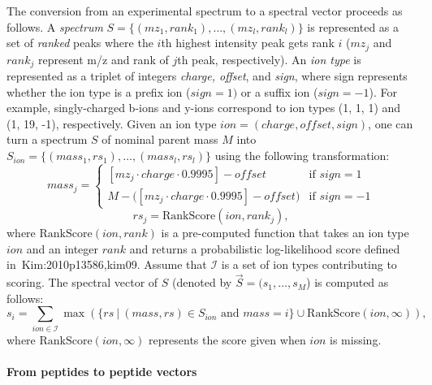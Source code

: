 The conversion from an experimental spectrum to a spectral vector proceeds as follows.
A \emph{spectrum} $S=\{(mz_1,rank_1),\ldots,(mz_l,rank_l)\}$ is represented as a set of {\em ranked} peaks where the $i$th highest intensity peak gets rank $i$
($mz_j$ and $rank_j$ represent m/z and rank of $j$th peak, respectively).
An \emph{ion type} is represented as a triplet of integers {\em charge, offset}, and {\em sign}, where sign represents whether the ion type is a prefix ion ($sign=1)$ or
a suffix ion ($sign=-1$). For example, singly-charged b-ions and y-ions correspond to ion types (1, 1, 1) and (1, 19, -1), respectively.
Given an ion type $ion=(charge,offset,sign)$, one can turn a spectrum $S$ of nominal parent mass $M$ into $S_{ion}=\{(mass_1,rs_1),\ldots,(mass_l,rs_l)\}$ using the following transformation: 
$$
  mass_j = \left\{
    \begin{array}{ll}
      [mz_j \cdot charge \cdot 0.9995]-offset & \textrm{if } sign = 1\\
      M - \big([mz_j \cdot charge \cdot 0.9995]-offset \big) & \textrm{if } sign = -1
    \end{array} \right.
$$
$$
 rs_j = \mathrm{RankScore}(ion,rank_j),
$$
where $\mathrm{RankScore}(ion,rank)$ is a pre-computed function that takes an ion type $ion$ and an integer $rank$ and returns a
probabilistic log-likelihood score defined in~\cite{unv}{Kim:2010p13586,kim09}. 
Assume that $\mathcal{I}$ is a set of ion types contributing to scoring. 
The spectral vector of $S$ (denoted by $\vec{S}=(s_1, \ldots, s_M$) is computed as follows:
$$
s_i = \sum_{ion \in \mathcal{I}}  \max (\{rs ~|~ (mass,rs) \in S_{ion} \textrm{ and } mass = i \} \cup \textrm{RankScore}(ion,\infty)),
$$
where $\textrm{RankScore}(ion,\infty)$ represents the score given when $ion$ is missing.

\paragraph{From peptides to peptide vectors}

